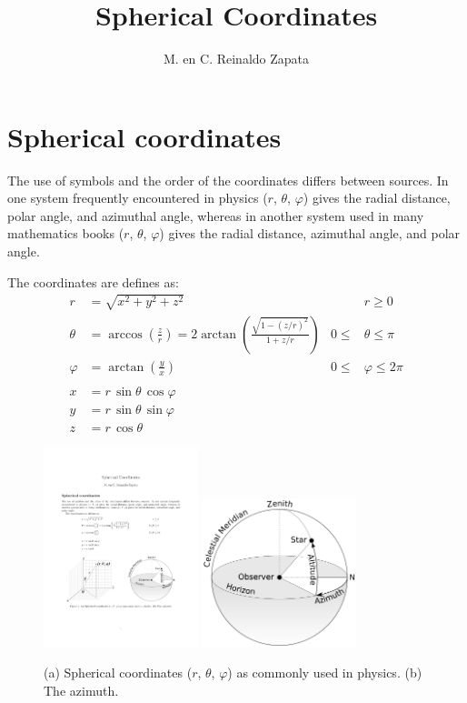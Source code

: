 \documentclass{article}
\title{Spherical Coordinates}
\author{M. en C. Reinaldo Zapata}
\date{}
\begin{document}
\maketitle

\section*{Spherical coordinates} %
\label{sec:spherical_coordinates}

The use of symbols and the order of the coordinates differs between sources. In
one system frequently encountered in physics ($r$, $\theta$, $\varphi$) gives
the radial distance, polar angle, and azimuthal angle, whereas in another system
used in many mathematics books ($r$, $\theta$, $\varphi$) gives the radial
distance, azimuthal angle, and polar angle.

The coordinates are defines as:
\begin{align*}
r &= \sqrt{x^{2} + y^{2} + z^{2}} & & r \geq 0\\
\theta &= \arccos \left( \frac{z}{r} \right) = 2 \arctan \left( \frac{\sqrt{1- 
(z/r)^{2} }}{1 + z/r} \right) & 0 \leq &\theta \leq \pi \\
\varphi &= \arctan \left( \frac{y}{x} \right) & 0 \leq &\varphi \leq 2\pi \\ \\ 
x &= r \, \sin \theta \, \cos \varphi \\
y &= r \, \sin \theta \, \sin \varphi \\
z &= r \, \cos \theta
\end{align*}


\begin{figure}[h]
    \centering
    \includegraphics[width=0.4\textwidth]{spherical_coordinates}
    \hspace{0.1\textwidth}
    \includegraphics[width=0.4\textwidth]{azimuth}
    \caption{(a) Spherical coordinates ($r$, $\theta$, $\varphi$) as commonly used
    in physics. (b) The azimuth.}
    \label{fig:spherical coordinates}
\end{figure}



\end{document}
